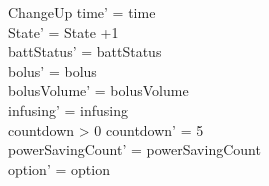 \begin{schema}{ChangeUp}
	time' = time\\ 
	State' = State +1\\
	battStatus' = battStatus\\
	bolus' = bolus\\
	bolusVolume' = bolusVolume\\
	infusing' = infusing\\
	countdown > 0 \land countdown' = 5\\
	powerSavingCount' = powerSavingCount\\ option' = option\\
\end{schema}

